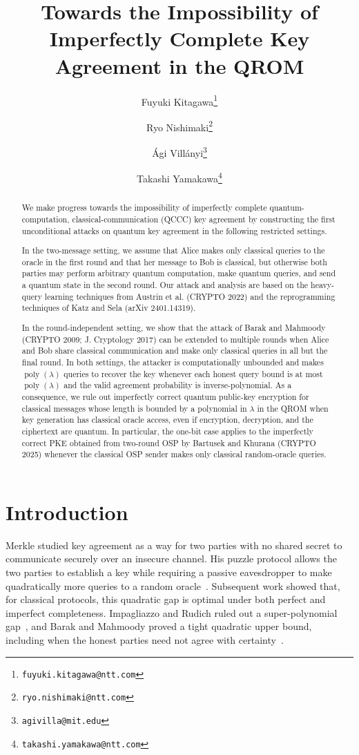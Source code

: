 \documentclass[11pt]{article}
\title{Towards the Impossibility of Imperfectly Complete Key Agreement in the QROM}
\author[1]{Fuyuki Kitagawa\thanks{\texttt{fuyuki.kitagawa@ntt.com}}}
\author[1]{Ryo Nishimaki\thanks{\texttt{ryo.nishimaki@ntt.com}}}
\author[2]{Ági Villányi\thanks{\texttt{agivilla@mit.edu}}}
\author[1]{Takashi Yamakawa\thanks{\texttt{takashi.yamakawa@ntt.com}}}
\affil[1]{NTT, Tokyo, Japan}
\affil[2]{Massachusetts Institute of Technology, Cambridge, MA, USA}
\date{}
\newcommand{\poly}{\operatorname{poly}}
\begin{document}
\maketitle

\begin{abstract}
We make progress towards the impossibility of imperfectly complete
quantum-computation, classical-communication (QCCC) key agreement by
constructing the first
unconditional attacks on quantum key agreement in the following restricted settings. 

In the two-message setting, we assume that Alice makes only classical queries to the oracle in the first round and that her message to Bob is classical, but otherwise both parties may perform arbitrary quantum computation, make quantum queries, and send a quantum state in the second round. Our attack and analysis are based on the heavy-query learning techniques from Austrin et al. (CRYPTO 2022) and the reprogramming techniques of Katz and Sela (arXiv 2401.14319). 

In the round-independent setting, we show that the attack of Barak and Mahmoody (CRYPTO 2009; J. Cryptology 2017) can be extended to multiple rounds when Alice and Bob share classical communication and make only classical queries in all but the final round. In both settings, the attacker is computationally unbounded and makes \(\poly(\lambda)\) queries to recover the key whenever each
honest query bound is at most \(\poly(\lambda)\) and the valid agreement probability is
inverse-polynomial. As a consequence, we rule out imperfectly correct quantum
public-key encryption for classical messages whose length is bounded by a
polynomial in \(\lambda\)
in the QROM when key generation has classical oracle access, even if
encryption, decryption, and the ciphertext are quantum. In particular, the
one-bit case applies to the imperfectly correct PKE obtained from two-round
OSP by Bartusek and Khurana (CRYPTO 2025) whenever the classical
OSP sender makes only classical random-oracle queries. 
\end{abstract}

\tableofcontents

\section{Introduction}

Merkle studied key agreement as a way for two parties with no shared secret
to communicate securely over an insecure channel.  His puzzle protocol allows
the two parties to establish a key while requiring a passive eavesdropper to
make quadratically more queries to a random oracle~\cite{Merkle78}. Subsequent work showed
that, for classical protocols, this quadratic gap is optimal under both
perfect and imperfect completeness.  Impagliazzo and Rudich ruled out a
super-polynomial gap~\cite{ImpagliazzoRudich89}, and Barak and Mahmoody proved
a tight quadratic upper bound, including when the honest parties need not
agree with certainty~\cite{BarakMahmoodyFull}.
\end{document}
